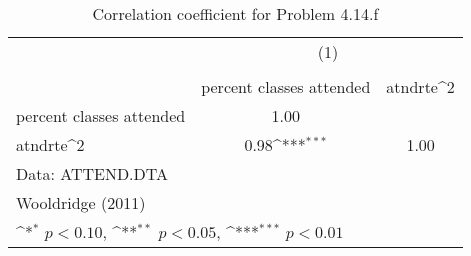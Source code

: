 \begin{table}[htbp]\centering
\def\sym#1{\ifmmode^{#1}\else\(^{#1}\)\fi}
\caption{Correlation coefficient for Problem 4.14.f}
\begin{tabular}{l*{2}{c}}
\toprule
                &\multicolumn{2}{c}{(1)}              \\
                &\multicolumn{2}{c}{}                 \\
                &percent classes attended         &atndrte^2         \\
\midrule
percent classes attended&     1.00         &                  \\
atndrte^2       &     0.98\sym{***}&     1.00         \\
\bottomrule
\multicolumn{3}{l}{\footnotesize Data: ATTEND.DTA}\\
\multicolumn{3}{l}{\footnotesize Wooldridge (2011)}\\
\multicolumn{3}{l}{\footnotesize \sym{*} \(p<0.10\), \sym{**} \(p<0.05\), \sym{***} \(p<0.01\)}\\
\end{tabular}
\end{table}
